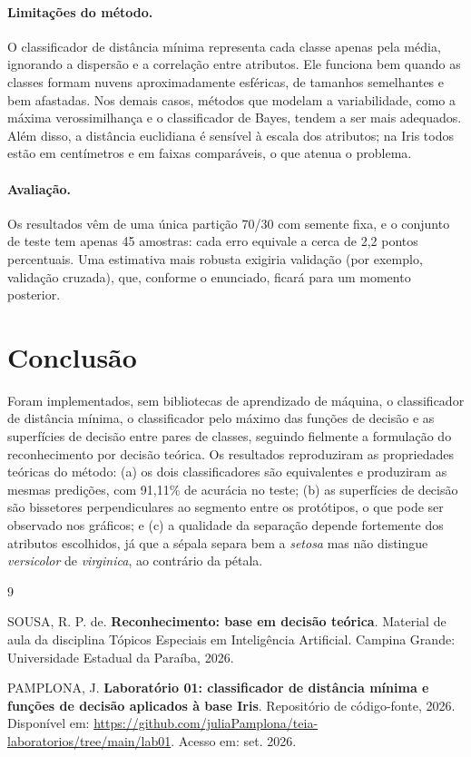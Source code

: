 \documentclass[12pt,a4paper]{article}
\newcommand{\repositorio}{\url{https://github.com/juliaPamplona/teia-laboratorios/tree/main/lab01}}
\begin{document}
\paragraph{Limitações do método.} O classificador de distância mínima representa cada classe apenas pela média, ignorando a dispersão e a correlação entre atributos. Ele funciona bem quando as classes formam nuvens aproximadamente esféricas, de tamanhos semelhantes e bem afastadas. Nos demais casos, métodos que modelam a variabilidade, como a máxima verossimilhança e o classificador de Bayes, tendem a ser mais adequados. Além disso, a distância euclidiana é sensível à escala dos atributos; na Iris todos estão em centímetros e em faixas comparáveis, o que atenua o problema.

\paragraph{Avaliação.} Os resultados vêm de uma única partição 70/30 com semente fixa, e o conjunto de teste tem apenas 45 amostras: cada erro equivale a cerca de 2,2 pontos percentuais. Uma estimativa mais robusta exigiria validação (por exemplo, validação cruzada), que, conforme o enunciado, ficará para um momento posterior.

\section{Conclusão}

Foram implementados, sem bibliotecas de aprendizado de máquina, o classificador de distância mínima, o classificador pelo máximo das funções de decisão e as superfícies de decisão entre pares de classes, seguindo fielmente a formulação do reconhecimento por decisão teórica. Os resultados reproduziram as propriedades teóricas do método: (a) os dois classificadores são equivalentes e produziram as mesmas predições, com 91,11\% de acurácia no teste; (b) as superfícies de decisão são bissetores perpendiculares ao segmento entre os protótipos, o que pode ser observado nos gráficos; e (c) a qualidade da separação depende fortemente dos atributos escolhidos, já que a sépala separa bem a \emph{setosa} mas não distingue \emph{versicolor} de \emph{virginica}, ao contrário da pétala.

\begin{thebibliography}{9}

SOUSA, R. P. de. \textbf{Reconhecimento: base em decisão teórica}. Material de aula da disciplina Tópicos Especiais em Inteligência Artificial. Campina Grande: Universidade Estadual da Paraíba, 2026.

PAMPLONA, J. \textbf{Laboratório 01: classificador de distância mínima e funções de decisão aplicados à base Iris}. Repositório de código-fonte, 2026. Disponível em: \repositorio. Acesso em: set. 2026.

\end{thebibliography}
\end{document}
